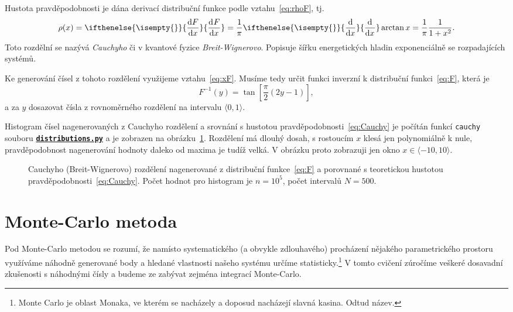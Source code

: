 \documentclass[a4paper,11pt,twoside]{article}
\renewcommand{\d}{\mathrm{d}}           %
\newcommand{\derivative}[3][]{\ifthenelse{\isempty{#1}}	    %
	{\frac{\d{#2}}{\d{#3}}}
	{\frac{\d^{#1}{#2}}{\d{#3}^{#1}}}
}
\def\code#1{\textnormal{\texttt{#1}}}
\def\ghfile#1#2{\textnormal{\textbf{\texttt{\href{https://github.com/PavelStransky/PCInPhysics/blob/main/#1#2}{#2}}}}}
\theoremstyle{red}
\theoremstyle{green}
\begin{document}
    \begin{solution}
        Hustota pravděpodobnosti je dána derivací distribuční funkce podle vztahu~\eqref{eq:rhoF}, tj.
        \begin{equation}
            \label{eq:Cauchy}
            \rho(x)=\derivative{F}{x}=\frac{1}{\pi}\derivative{}{x}\arctan{x}=\frac{1}{\pi}\frac{1}{1+x^{2}}.
        \end{equation}
        Toto rozdělní se nazývá \emph{Cauchyho} či v kvantové fyzice \emph{Breit-Wignerovo}. 
        Popisuje šířku energetických hladin exponenciálně se rozpadajících systémů.

        Ke generování čísel z tohoto rozdělení využijeme vztahu~\eqref{eq:xF}.
        Musíme tedy určit funkci inverzní k distribuční funkci~\eqref{eq:F}, která je
        \begin{equation}
            F^{-1}(y)=\tan\left[\frac{\pi}{2}\left(2y-1\right)\right],
        \end{equation}
        a za $y$ dosazovat čísla z rovnoměrného rozdělení na intervalu $\langle0,1\rangle$.

        Histogram čísel nagenerovaných z Cauchyho rozdělení a srovnání s hustotou pravděpodobnosti~\eqref{eq:Cauchy} je počítán funkcí \code{cauchy} souboru \ghfile{python/histogram/}{distributions.py} a je zobrazen na obrázku~\ref{fig:F}.
        Rozdělení má dlouhý dosah, s rostoucím $x$ klesá jen polynomiálně k nule, pravděpodobnost nagenerování hodnoty daleko od maxima je tudíž velká. 
        V obrázku proto zobrazuji jen okno $x\in\langle-10,10\rangle$.

        \begin{figure}[!htb]
            \centering{}
            \caption{
                \protect\small
                Cauchyho (Breit-Wignerovo) rozdělení nagenerované z distribuční funkce~\eqref{eq:F} a porovnané s teoretickou hustotou pravděpodobnosti~\eqref{eq:Cauchy}.
                Počet hodnot pro histogram je $n=10^5$, počet intervalů $N=500$.
            }
            \label{fig:F}
        \end{figure}    
    \end{solution}

\section{Monte-Carlo metoda}
    Pod Monte-Carlo metodou se rozumí, že namísto systematického (a obvykle zdlouhavého) procházení nějakého parametrického prostoru využíváme náhodně generované body a hledané vlastnosti našeho systému určíme statisticky.\footnote{
        Monte Carlo je oblast Monaka, ve kterém se nacházely a doposud nacházejí slavná kasina.
        Odtud název.
    }
    V tomto cvičení zúročíme veškeré dosavadní zkušenosti s náhodnými čísly a budeme ze zabývat zejména integrací Monte-Carlo.
\end{document}

